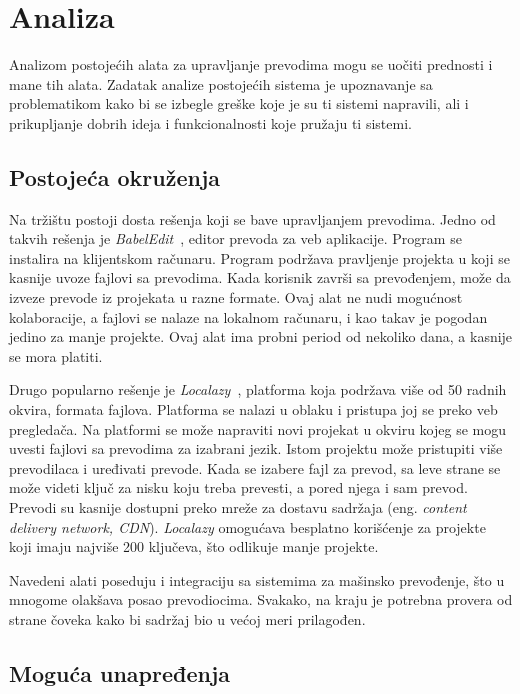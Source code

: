 \chapter{Analiza}\label{ch:analiza}

Analizom postojećih alata za upravljanje prevodima mogu se uočiti prednosti i mane tih alata. 
Zadatak analize postojećih sistema je upoznavanje sa problematikom kako bi se izbegle greške
koje je su ti sistemi napravili, ali i prikupljanje dobrih ideja i funkcionalnosti koje pružaju ti sistemi.


\section{Postojeća okruženja}\label{sec:analiza-postojeca_okruzenja}

Na tržištu postoji dosta rešenja koji se bave upravljanjem prevodima. Jedno od takvih rešenja je 
\textit{BabelEdit}~\cite{BabelEdit}, editor prevoda za veb aplikacije. Program se instalira na klijentskom računaru.
Program podržava pravljenje projekta u koji se kasnije uvoze fajlovi sa prevodima. Kada korisnik završi 
sa prevođenjem, može da izveze prevode iz projekata u razne formate. Ovaj alat ne nudi mogućnost kolaboracije,
a fajlovi se nalaze na lokalnom računaru, i kao takav je pogodan jedino za manje projekte. Ovaj alat ima 
probni period od nekoliko dana, a kasnije se mora platiti.

Drugo popularno rešenje je \textit{Localazy}~\cite{Localazy}, platforma koja podržava više od 50 radnih okvira, 
formata fajlova. Platforma se nalazi u oblaku i pristupa joj se preko veb pregledača. Na platformi se može 
napraviti novi projekat u okviru kojeg se mogu uvesti fajlovi sa prevodima za izabrani jezik. Istom projektu 
može pristupiti više prevodilaca i uređivati prevode. Kada se izabere fajl za prevod, sa leve strane se može 
videti ključ za nisku koju treba prevesti, a pored njega i sam prevod. Prevodi su kasnije dostupni preko 
mreže za dostavu sadržaja (eng. \textit{content delivery network, CDN}). \textit{Localazy} omogućava besplatno korišćenje za 
projekte koji imaju najviše 200 ključeva, što odlikuje manje projekte.

Navedeni alati poseduju i integraciju sa sistemima za mašinsko prevođenje, što u mnogome olakšava posao 
prevodiocima. Svakako, na kraju je potrebna provera od strane čoveka kako bi sadržaj bio u većoj meri prilagođen. 


\section{Moguća unapređenja}\label{sec:analiza-moguca_unapredjenja}

